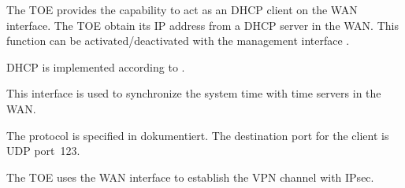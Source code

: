 



The TOE provides the capability to act as an DHCP client on the WAN
interface. The TOE obtain its IP address from a DHCP server in the WAN. This function can be activated/deactivated with the management interface \lslanhttpmgmt{}.





DHCP is implemented according to .





This interface is used to synchronize the system time with time servers in the
WAN.





The protocol is specified in  dokumentiert. The destination port
for the client is UDP port~123.






The TOE uses the WAN interface to establish the VPN channel with IPsec.





